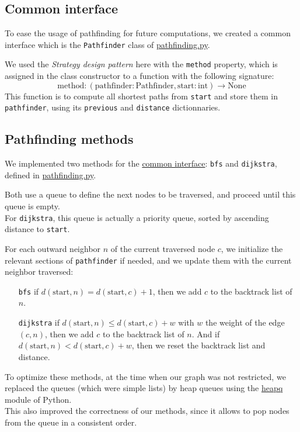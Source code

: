 \documentclass[12pt,english]{article}
\begin{document}
	\subsection{Common interface}\label{sec:step:2.1}

	To ease the usage of pathfinding for future computations, we created a common interface which is the \texttt{Pathfinder} class of \hyperref[sec:code:pathfinding]{\ttfamily pathfinding.py}.

	We used the \emph{Strategy design pattern} here with the \texttt{method} property, which is assigned in the class constructor to a function with the following signature: \[
		\text{method}: (\text{pathfinder}: \text{Pathfinder}, \text{start}: \text{int}) \rightarrow \text{None}
	\]
	This function is to compute all shortest paths from \texttt{start} and store them in \texttt{pathfinder}, using its \texttt{previous} and \texttt{distance} dictionnaries.

	\subsection{Pathfinding methods}\label{sec:step:2.2}

	We implemented two methods for the \hyperref[sec:step:2.1]{common interface}: \texttt{bfs} and \texttt{dijkstra}, defined in \hyperref[sec:code:pathfinding]{\ttfamily pathfinding.py}.

	Both use a queue to define the next nodes to be traversed, and proceed until this queue is empty.\\
	For \texttt{dijkstra}, this queue is actually a priority queue, sorted by ascending distance to \texttt{start}.

	For each outward neighbor \(n\) of the current traversed node \(c\), we initialize the relevant sections of \texttt{pathfinder} if needed, and we update them with the current neighbor traversed:
	\begin{itemize}
		\item[\texttt{bfs}] if \(d(\text{start},n) = d(\text{start},c) + 1\), then we add \(c\) to the backtrack list of \(n\).
		\item[\texttt{dijkstra}] if \(d(\text{start},n) \le d(\text{start},c) + w\) with \(w\) the weight of the edge \((c,n)\), then we add \(c\) to the backtrack list of \(n\). And if \(d(\text{start},n) < d(\text{start},c) + w\), then we reset the backtrack list and distance.
	\end{itemize}

	To optimize these methods, at the time when our graph was not restricted, we replaced the queues (which were simple lists) by heap queues using the \href{https://docs.python.org/3/library/heapq.html}{\ttfamily heapq} module of Python.\\
	This also improved the correctness of our methods, since it allows to pop nodes from the queue in a consistent order.
\end{document}
